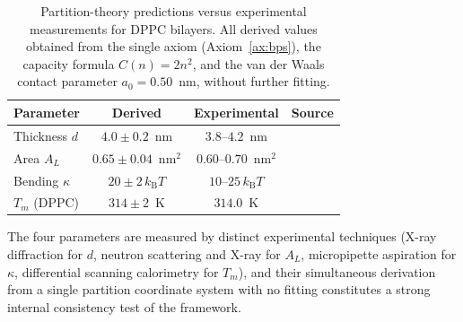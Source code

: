 \documentclass[11pt,twocolumn,a4paper]{article}
\theoremstyle{definition}
\theoremstyle{remark}
\newcommand{\kB}{k_{\mathrm{B}}}
\begin{document}
\begin{table}[h!]
\centering
\caption{Partition-theory predictions versus experimental measurements for
DPPC bilayers. All derived values obtained from the single axiom (Axiom~\ref{ax:bps}),
the capacity formula $C(n) = 2n^2$, and the van der Waals contact parameter
$a_0 = 0.50$~nm, without further fitting.}
\label{tab:validation}
\begin{tabular}{lccl}
\toprule
Parameter & Derived & Experimental & Source \\
\midrule
Thickness $d$ & $4.0 \pm 0.2$~nm & $3.8$--$4.2$~nm & \citep{nagle2000} \\
Area $A_L$ & $0.65 \pm 0.04$~nm$^2$ & $0.60$--$0.70$~nm$^2$ & \citep{nagle2000} \\
Bending $\kappa$ & $20 \pm 2\,\kB T$ & $10$--$25\,\kB T$ & \citep{evans1990,rawicz2000} \\
$T_m$ (DPPC) & $314 \pm 2$~K & $314.0$~K & \citep{nagle2000,marsh2013} \\
\bottomrule
\end{tabular}
\end{table}

The four parameters are measured by distinct experimental techniques
(X-ray diffraction for $d$, neutron scattering and X-ray for $A_L$,
micropipette aspiration for $\kappa$, differential scanning calorimetry
for $T_m$), and their simultaneous derivation from a single partition
coordinate system with no fitting constitutes a strong internal consistency
test of the framework.
\end{document}
